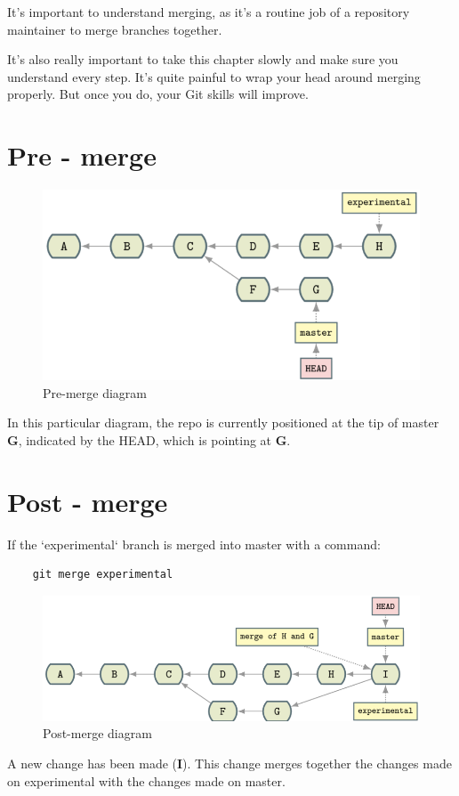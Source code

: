\documentclass{report}
\begin{document}
It's important to understand merging, as it's a routine job of a repository maintainer to merge branches together.

It's also really important to take this chapter slowly and make sure you understand every step. It's quite painful to wrap your head around merging properly. But once you do, your Git skills will improve.

\section{Pre - merge}

\begin{figure}[H]
    \centering
    \includegraphics[width=0.5 \linewidth]{Photos/merge-1.png}
    \caption[short]{Pre-merge diagram}
    \label{fig:merge-1} 
\end{figure}

In this particular diagram, the repo is currently positioned at the tip of master \textbf{G}, indicated by the HEAD, which is pointing at \textbf{G}.

\section{Post - merge}

If the `experimental` branch is merged into master with a command:

\begin{lstlisting}
    git merge experimental
\end{lstlisting}

\begin{figure}[H]
    \centering
    \includegraphics[width=0.5 \linewidth]{Photos/merge-2.png}
    \caption[short]{Post-merge diagram}
    \label{fig:merge-2}
\end{figure}

A new change has been made (\textbf{I}). This change merges together the changes made on experimental with the changes made on master.
\end{document}
